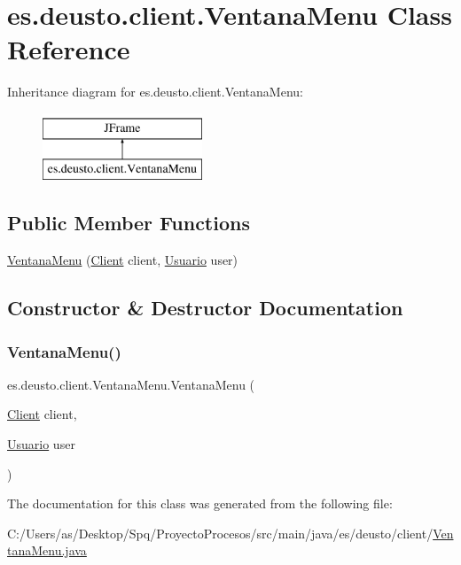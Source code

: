 \hypertarget{classes_1_1deusto_1_1client_1_1_ventana_menu}{}\section{es.\+deusto.\+client.\+Ventana\+Menu Class Reference}
\label{classes_1_1deusto_1_1client_1_1_ventana_menu}
Inheritance diagram for es.\+deusto.\+client.\+Ventana\+Menu\+:\begin{figure}[H]
\begin{center}
\leavevmode
\includegraphics[height=2.000000cm]{classes_1_1deusto_1_1client_1_1_ventana_menu}
\end{center}
\end{figure}
\subsection*{Public Member Functions}
\begin{DoxyCompactItemize}
\item 
\mbox{\hyperlink{classes_1_1deusto_1_1client_1_1_ventana_menu_a7fbd92bbd21b15738ee475e383d54de7}{Ventana\+Menu}} (\mbox{\hyperlink{classes_1_1deusto_1_1client_1_1_client}{Client}} client, \mbox{\hyperlink{classes_1_1deusto_1_1server_1_1jdo_1_1_usuario}{Usuario}} user)
\end{DoxyCompactItemize}


\subsection{Constructor \& Destructor Documentation}
\mbox{\label{classes_1_1deusto_1_1client_1_1_ventana_menu_a7fbd92bbd21b15738ee475e383d54de7}} 
\subsubsection{\texorpdfstring{VentanaMenu()}{VentanaMenu()}}
{\footnotesize\ttfamily es.\+deusto.\+client.\+Ventana\+Menu.\+Ventana\+Menu (\begin{DoxyParamCaption}\item[{\mbox{\hyperlink{classes_1_1deusto_1_1client_1_1_client}{Client}}}]{client,  }\item[{\mbox{\hyperlink{classes_1_1deusto_1_1server_1_1jdo_1_1_usuario}{Usuario}}}]{user }\end{DoxyParamCaption})}



The documentation for this class was generated from the following file\+:\begin{DoxyCompactItemize}
\item 
C\+:/\+Users/as/\+Desktop/\+Spq/\+Proyecto\+Procesos/src/main/java/es/deusto/client/\mbox{\hyperlink{_ventana_menu_8java}{Ventana\+Menu.\+java}}\end{DoxyCompactItemize}
